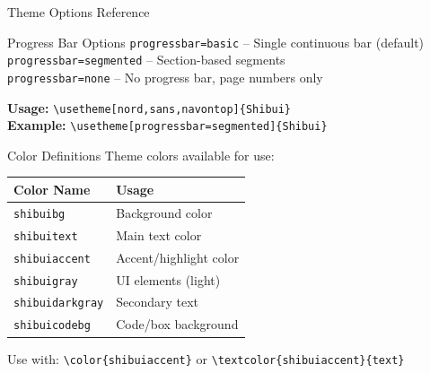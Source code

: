 \documentclass[aspectratio=169]{beamer}
\begin{document}
\begin{frame}[allowframebreaks]{Theme Options Reference}
  \vspace{0.3em}

  \begin{shibuiframe}{Progress Bar Options}
    \texttt{progressbar=basic} -- Single continuous bar (default) \\
    \texttt{progressbar=segmented} -- Section-based segments \\
    \texttt{progressbar=none} -- No progress bar, page numbers only
  \end{shibuiframe}

  \vspace{0.3em}

  \textbf{Usage:} \texttt{\textbackslash usetheme[nord,sans,navontop]\{Shibui\}} \\
  \textbf{Example:} \texttt{\textbackslash usetheme[progressbar=segmented]\{Shibui\}}
\end{frame}

\begin{frame}{Color Definitions}
  Theme colors available for use:

  \vspace{1em}

  \centering
  \begin{tabular}{ll}
    \hline
    \textbf{Color Name} & \textbf{Usage} \\
    \hline
    \texttt{shibuibg} & Background color \\
    \texttt{shibuitext} & Main text color \\
    \texttt{shibuiaccent} & Accent/highlight color \\
    \texttt{shibuigray} & UI elements (light) \\
    \texttt{shibuidarkgray} & Secondary text \\
    \texttt{shibuicodebg} & Code/box background \\
    \hline
  \end{tabular}

  \vspace{1em}

  \small Use with: \texttt{\textbackslash color\{shibuiaccent\}} or \texttt{\textbackslash textcolor\{shibuiaccent\}\{text\}}
\end{frame}
\end{document}
